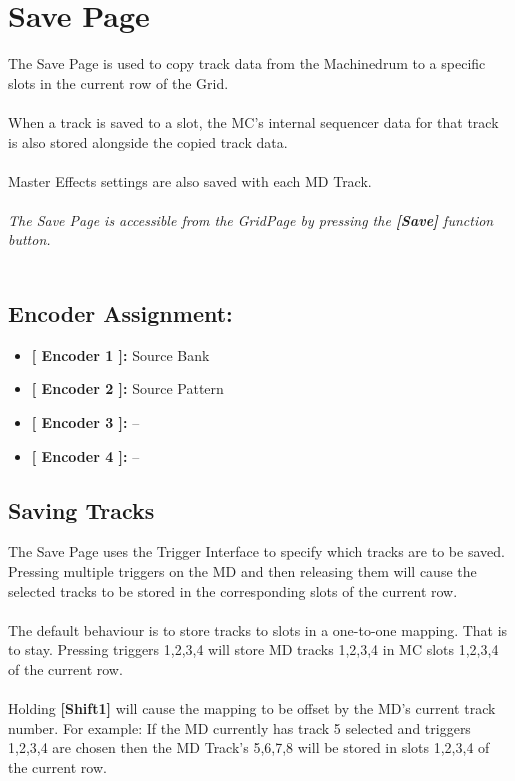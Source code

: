 \chapter{Save Page}

The Save Page is used to copy track data from the Machinedrum to a specific slots in the current row of the Grid. \\
\\
When a track is saved to a slot, the MC's internal sequencer data for that track is also stored alongside the copied track data.\\
\\
Master Effects settings are also saved with each MD Track.
\\\\
\textit{The Save Page is accessible from the GridPage by pressing the  \textbf{[Save]} function button.}
\\\\
\section{Encoder Assignment:}
\begin{itemize}
	\item \textbf{[ Encoder 1 ]: }Source Bank
	\item \textbf{[ Encoder 2 ]: }Source Pattern
	\item \textbf{[ Encoder 3 ]: }--
	\item \textbf{[ Encoder 4 ]: }--
\end{itemize}
\section{Saving Tracks}
The Save Page uses the Trigger Interface to specify which tracks are to be saved. Pressing multiple triggers on the MD and then releasing them will cause the selected tracks to be stored in the corresponding slots of the current row.\\
\\
The default behaviour is to store tracks to slots in a one-to-one mapping. That is to stay. Pressing triggers 1,2,3,4 will store MD tracks 1,2,3,4 in MC slots 1,2,3,4 of the current row.\\
\\
Holding  \textbf{[Shift1]} will cause the mapping to be offset by the MD's current track number. For example: If the MD currently has track 5 selected and triggers 1,2,3,4 are chosen then the MD Track's 5,6,7,8 will be stored in slots 1,2,3,4 of the current row.

